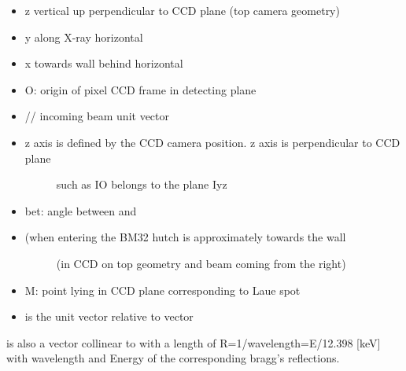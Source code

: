 \documentclass[letterpaper,10pt,english]{sphinxmanual}
\begin{document}
\begin{itemize}
\begin{description}
\begin{itemize}
\item {} 
z vertical up perpendicular to CCD plane (top camera geometry)

\item {} 
y along X-ray horizontal

\item {} 
x towards wall behind horizontal

\item {} 
O: origin of pixel CCD frame in detecting plane

\item {} 
 //  incoming beam unit vector

\item {} \begin{description}
\item[{z axis is defined by the CCD camera position. z axis is perpendicular to CCD plane}] \leavevmode
such as IO belongs to the plane Iyz

\end{description}

\item {} 
bet: angle between  and 

\item {} \begin{description}
\item[{ (when entering the BM32 hutch  is approximately towards the wall}] \leavevmode
(in CCD on top geometry and beam coming from the right)

\end{description}

\item {} 
M: point lying in CCD plane corresponding to Laue spot

\item {} 
 is the unit vector relative to vector 

\end{itemize}

\end{description}

\end{itemize}

 is also a vector collinear to  with a length of R=1/wavelength=E/12.398 {[}keV{]}
with wavelength and Energy of the corresponding bragg’s reflections.
\end{document}
